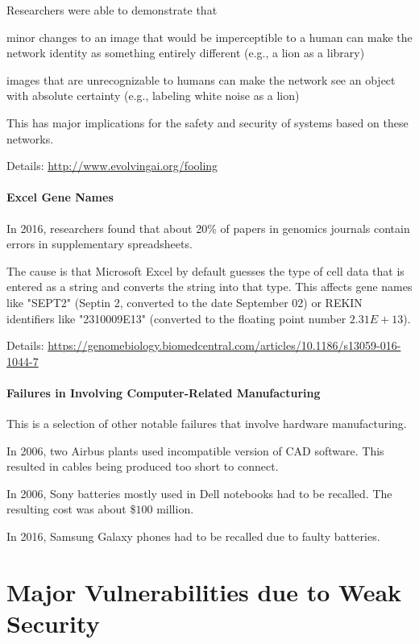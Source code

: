 Researchers were able to demonstrate that
\begin{compactitem}
 \item minor changes to an image that would be imperceptible to a human can make the network identity as something entirely different (e.g., a lion as a library)
 \item images that are unrecognizable to humans can make the network see an object with absolute certainty (e.g., labeling white noise as a lion)
\end{compactitem}
This has major implications for the safety and security of systems based on these networks.

Details: \url{http://www.evolvingai.org/fooling}

\paragraph{Excel Gene Names}
In 2016, researchers found that about 20\% of papers in genomics journals contain errors in supplementary spreadsheets.

The cause is that Microsoft Excel by default guesses the type of cell data that is entered as a string and converts the string into that type.
This affects gene names like "SEPT2" (Septin 2, converted to the date September 02) or REKIN identifiers like "2310009E13" (converted to the floating point number $2.31E+13$).

Details: \url{https://genomebiology.biomedcentral.com/articles/10.1186/s13059-016-1044-7}

\paragraph{Failures in Involving Computer-Related Manufacturing}
This is a selection of other notable failures that involve hardware manufacturing.

In 2006, two Airbus plants used incompatible version of CAD software.
This resulted in cables being produced too short to connect.

In 2006, Sony batteries mostly used in Dell notebooks had to be recalled.
The resulting cost was about \$$100$ million.

In 2016, Samsung Galaxy phones had to be recalled due to faulty batteries.

\section{Major Vulnerabilities due to Weak Security}

